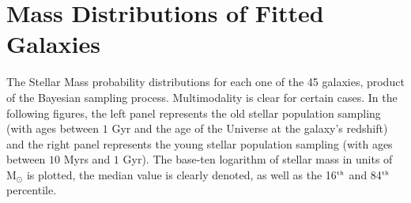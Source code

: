 \chapter{Mass Distributions of Fitted Galaxies} \label{app:MassDistri}

The Stellar Mass probability distributions for each one of the 45 galaxies, product of the Bayesian sampling process. Multimodality is clear for certain cases. In the following figures, the left panel represents the old stellar population sampling (with ages between $1$ Gyr and the age of the Universe at the galaxy's redshift) and the right panel represents the young stellar population sampling (with ages between $10$ Myrs and $1$ Gyr). The base-ten logarithm of  
stellar mass in units of M$_\odot$ is plotted, the median value is clearly denoted, as well as the 16$^{\mbox{\tiny{th}}}$ and 84$^{\mbox{\tiny{th}}}$ percentile.


